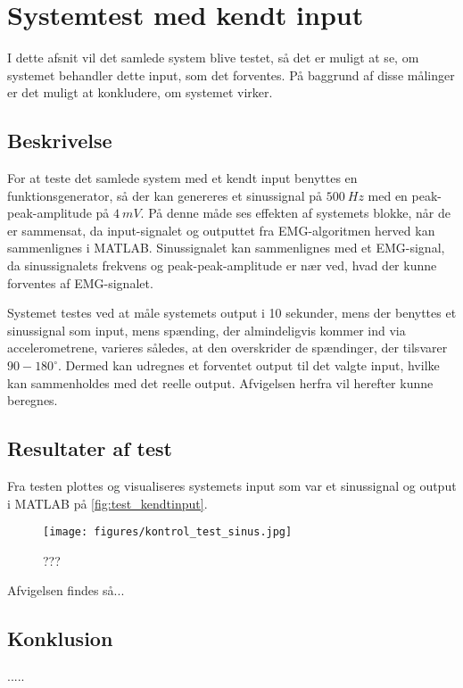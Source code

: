 \section{Systemtest med kendt input}
I dette afsnit vil det samlede system blive testet, så det er muligt at se, om systemet behandler dette input, som det forventes. På baggrund af disse målinger er det muligt at konkludere, om systemet virker. 

\subsection{Beskrivelse}
For at teste det samlede system med et kendt input benyttes en funktionsgenerator, så der kan genereres et sinussignal på $500~Hz$ med en peak-peak-amplitude på $4~mV$. På denne måde ses effekten af systemets blokke, når de er sammensat, da input-signalet og outputtet fra EMG-algoritmen herved kan sammenlignes i MATLAB. Sinussignalet kan sammenlignes med et EMG-signal, da sinussignalets frekvens og peak-peak-amplitude er nær ved, hvad der kunne forventes af EMG-signalet. 

Systemet testes ved at måle systemets output i 10 sekunder, mens der benyttes et sinussignal som input, mens spænding, der almindeligvis kommer ind via accelerometrene, varieres således, at den overskrider de spændinger, der tilsvarer $90-180^{\circ}$. 
Dermed kan udregnes et forventet output til det valgte input, hvilke kan sammenholdes med det reelle output. Afvigelsen herfra vil herefter kunne beregnes. 
 
\subsection{Resultater af test}
Fra testen plottes og visualiseres systemets input som var et sinussignal og output i MATLAB på \autoref{fig:test_kendtinput}. 

\begin{figure}[H]
\centering
\texttt{[image: figures/kontrol\_test\_sinus.jpg]}
\caption{???}
\label{fig:test_kendtinput}
\end{figure}

Afvigelsen findes så...

\subsection{Konklusion}
.....